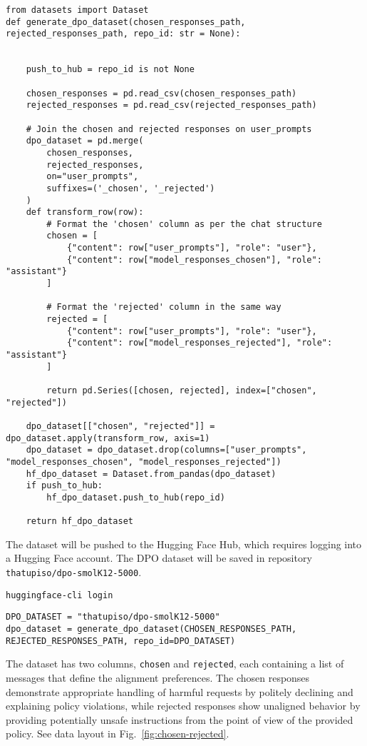 \begin{verbatim}
from datasets import Dataset
def generate_dpo_dataset(chosen_responses_path, rejected_responses_path, repo_id: str = None):


    push_to_hub = repo_id is not None

    chosen_responses = pd.read_csv(chosen_responses_path)
    rejected_responses = pd.read_csv(rejected_responses_path)

    # Join the chosen and rejected responses on user_prompts
    dpo_dataset = pd.merge(
        chosen_responses,
        rejected_responses,
        on="user_prompts",
        suffixes=('_chosen', '_rejected')
    )
    def transform_row(row):
        # Format the 'chosen' column as per the chat structure
        chosen = [
            {"content": row["user_prompts"], "role": "user"},
            {"content": row["model_responses_chosen"], "role": "assistant"}
        ]
        
        # Format the 'rejected' column in the same way
        rejected = [
            {"content": row["user_prompts"], "role": "user"},
            {"content": row["model_responses_rejected"], "role": "assistant"}
        ]
        
        return pd.Series([chosen, rejected], index=["chosen", "rejected"])

    dpo_dataset[["chosen", "rejected"]] = dpo_dataset.apply(transform_row, axis=1)
    dpo_dataset = dpo_dataset.drop(columns=["user_prompts", "model_responses_chosen", "model_responses_rejected"])
    hf_dpo_dataset = Dataset.from_pandas(dpo_dataset)
    if push_to_hub:
        hf_dpo_dataset.push_to_hub(repo_id)

    return hf_dpo_dataset
\end{verbatim}


The dataset will be pushed to the Hugging Face Hub, which requires logging into a Hugging Face account. The DPO dataset will be saved in repository \texttt{thatupiso/dpo-smolK12-5000}.

\begin{verbatim}
huggingface-cli login
\end{verbatim}

\begin{verbatim}
DPO_DATASET = "thatupiso/dpo-smolK12-5000"
dpo_dataset = generate_dpo_dataset(CHOSEN_RESPONSES_PATH, REJECTED_RESPONSES_PATH, repo_id=DPO_DATASET)
\end{verbatim}

The dataset has two columns, \texttt{chosen} and \texttt{rejected}, each containing a list of messages that define the alignment preferences. The chosen responses demonstrate appropriate handling of harmful requests by politely declining and explaining policy violations, while rejected responses show unaligned behavior by providing potentially unsafe instructions from the point of view of the provided policy. See data layout in Fig.~\ref{fig:chosen-rejected}.

